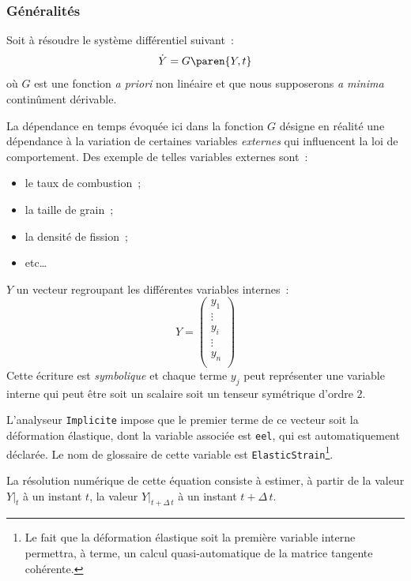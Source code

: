 \documentclass[rectoverso,pleiades,pstricks,leqno,anti]{texmf/note_technique_2010}
\newcommand{\debutpas}[1]{\ensuremath{\left.#1\right|_{t}}}
\newcommand{\finpas}[1]{\ensuremath{\left.#1\right|_{t+\Delta\, t}}}
\begin{document}
\subsubsection{Généralités} Soit à résoudre le système différentiel
suivant~:
\begin{equation}
  \label{eq:systeme_diff-implicite}
  \dot{Y}=G\paren{Y,t}
\end{equation}
où \(G\) est une fonction {\em a priori} non linéaire et que nous
supposerons {\em a minima} continûment dérivable.

La dépendance en temps évoquée ici dans la fonction \(G\) désigne en
réalité une dépendance à la variation de certaines variables {\em
  externes} qui influencent la loi de comportement. Des exemple de
telles variables externes sont~:
\begin{minipage}[t]{0.5\linewidth}
  \begin{itemize}
    \item le taux de combustion~;
    \item la taille de grain~;
    \item la densité de fission~;
    \item etc\ldots
  \end{itemize}
\end{minipage}

\(Y\) un vecteur regroupant les différentes variables internes~:
\[
Y=
\begin{pmatrix}
  y_{1} \\
  \vdots \\
  y_{i} \\
  \vdots \\
  y_{n} \\
\end{pmatrix}
\]
Cette écriture est {\em symbolique} et chaque terme \(y_{j}\) peut
représenter une variable interne qui peut être soit un scalaire soit un
tenseur symétrique d'ordre \(2\).

L'analyseur \texttt{Implicite} impose que le premier terme de ce vecteur
soit la déformation élastique, dont la variable associée est
\texttt{eel}, qui est automatiquement déclarée. Le nom de glossaire de
cette variable est \texttt{Elastic\-Strain}\footnote{Le fait que la
  déformation élastique soit la première variable interne permettra, à
  terme, un calcul quasi-automatique de la matrice tangente cohérente.}.

La résolution numérique de cette équation consiste à estimer, à partir
de la valeur \(\debutpas{Y}\) à un instant \(t\), la valeur
\(\finpas{Y}\) à un instant \(t+\Delta\, t\).
\end{document}
